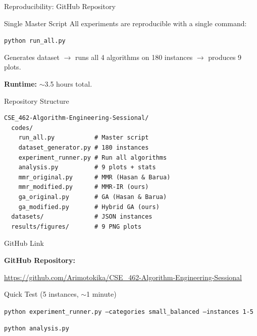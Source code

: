 \documentclass[aspectratio=43,8pt]{beamer}
\begin{document}
\begin{frame}[fragile]{Reproducibility: GitHub Repository}
\begin{block}{Single Master Script}
All experiments are reproducible with a single command:
\begin{center}
\texttt{python run\_all.py}
\end{center}
Generates dataset $\rightarrow$ runs all 4 algorithms on 180 instances $\rightarrow$ produces 9 plots.

\textbf{Runtime:} $\sim$3.5 hours total.
\end{block}

\vspace{0.2cm}
\begin{exampleblock}{Repository Structure}
\small
\begin{verbatim}
CSE_462-Algorithm-Engineering-Sessional/
  codes/
    run_all.py           # Master script
    dataset_generator.py # 180 instances
    experiment_runner.py # Run all algorithms
    analysis.py          # 9 plots + stats
    mmr_original.py      # MMR (Hasan & Barua)
    mmr_modified.py      # MMR-IR (ours)
    ga_original.py       # GA (Hasan & Barua)
    ga_modified.py       # Hybrid GA (ours)
  datasets/              # JSON instances
  results/figures/       # 9 PNG plots
\end{verbatim}
\end{exampleblock}
\end{frame}

\begin{frame}{GitHub Link}
\begin{center}
\vspace{1cm}
{\Large\textbf{GitHub Repository:}}

\vspace{0.5cm}
{\large\url{https://github.com/Arimotokika/CSE_462-Algorithm-Engineering-Sessional}}

\vspace{1cm}
\begin{block}{Quick Test (5 instances, $\sim$1 minute)}
\begin{center}
\texttt{python experiment\_runner.py --categories small\_balanced --instances 1-5}

\texttt{python analysis.py}
\end{center}
\end{block}
\end{center}
\end{frame}

\end{document}
